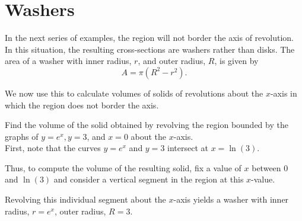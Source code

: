 \documentclass[handout]{ximera}
\begin{document}
\section{Washers} In the next series of examples, the region will not border the axis of revolution. 
In this situation, the resulting cross-sections are washers rather than disks.
The area of a washer with inner radius, $r$, and outer radius, $R$, is given by 
\[
A = \pi(R^2 - r^2).
\]



We now use this to calculate volumes of solids of revolutions about the $x$-axis in which the region does not border the axis.

\begin{example}[example 4] Find the volume of the solid obtained by revolving the region bounded by the graphs of 
$y = e^x, y = 3$, and $x = 0$ about the $x$-axis.\\
First, note that the curves $y = e^x$ and $y = 3$ intersect at $x = \ln(3)$.


Thus, to compute the volume of the resulting solid, fix a value of $x$ between $0$ and $\ln(3)$ and consider a vertical segment in the region at this $x$-value.


Revolving this individual segment about the $x$-axis yields a washer with inner radius, $r = e^x$, outer radius, $R = 3$. 


\begin{image}
\end{image}
\end{example}
\end{document}
